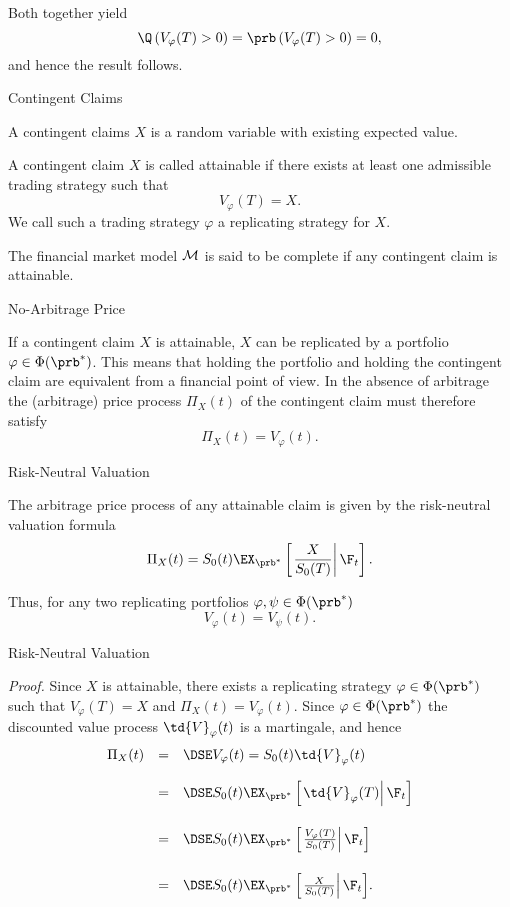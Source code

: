 Both together yield
$$
\Q\left(V_\varphi(T) > 0\right) = \prb\left(V_\varphi(T) >
0\right) =0,
$$
and hence the result follows.\hfill \eb

{ Contingent Claims}

A contingent claims $X$ is a random variable with existing expected value.






	A contingent claim $X$ is called attainable if there
exists at least one admissible trading strategy such that
$$
V_\varphi(T) = X.
$$
We call such a  trading strategy $\varphi$ a replicating strategy
for $X$.

	 The financial market model ${\cal M}$ is said
to be complete if any contingent claim is attainable.






{ No-Arbitrage Price}

If a contingent claim $X$ is attainable, $X$ can be replicated by
a portfolio $\varphi \in \Phi(\prb^*)$. This means that holding
the portfolio and holding the contingent claim are equivalent from
a financial point of view. In the absence of arbitrage the
(arbitrage) price process $\Pi_X(t)$ of the contingent claim must
therefore satisfy
$$
\Pi_X(t) = V_\varphi(t).
$$

{ Risk-Neutral Valuation}

The arbitrage price process of
any attainable claim is given by the risk-neutral valuation
formula
$$
\Pi_X(t) = S_0(t)
\EX_{\prb^*}\left[\left.\frac{X}{S_0(T)}\right|\F_t\right].
$$

Thus, for any two replicating portfolios $\varphi, \psi \in
\Phi(\prb^*)$
$$
V_\varphi(t) = V_\psi(t).
$$

{ Risk-Neutral Valuation}

{\it Proof.} Since $X$ is
attainable, there exists a replicating strategy $\varphi \in
\Phi(\prb^*)$ such that $V_\varphi(T) = X$ and $\Pi_X(t) =
V_\varphi(t)$. Since $\varphi \in \Phi(\prb^*)$ the discounted
value process $\td{V}_\varphi(t)$ is a martingale, and hence
$$
\begin{array}{lll}
\Pi_X(t) &=&\DSE V_\varphi(t) = S_0(t)\td{V}_\varphi(t) \\*[12pt]
&=&\DSE S_0(t) \EX_{\prb^*}
\left[\left.\td{V}_\varphi(T)\right|\F_t\right]\\*[18pt]
&=&\DSE S_0(t)
\EX_{\prb^*}
\left[\left.\frac{V_\varphi(T)}{S_0(T)}\right|\F_t\right]\\*[18pt]
&=&\DSE S_0(t) \EX_{\prb^*}
\left[\left.\frac{X}{S_0(T)}\right|\F_t\right]\!.
\end{array}
$$
\hfill \eb

